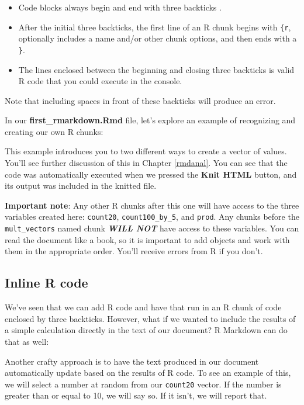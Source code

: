 \documentclass[]{tufte-book}
\providecommand{\tightlist}{%
  \setlength{\itemsep}{0pt}\setlength{\parskip}{0pt}}
\begin{document}
\begin{itemize}
\tightlist
\item
  Code blocks always begin and end with three backticks \texttt{\textasciigrave{}\textasciigrave{}\textasciigrave{}}.
\item
  After the initial three backticks, the first line of an R chunk begins with \texttt{\{r}, optionally includes a name and/or other chunk options, and then ends with a \texttt{\}}.
\item
  The lines enclosed between the beginning and closing three backticks is valid R code that you could execute in the console.
\end{itemize}

Note that including spaces in front of these backticks will produce an error.

In our \textbf{first\_rmarkdown.Rmd} file, let's explore an example of recognizing and creating our own R chunks:

This example introduces you to two different ways to create a vector of values. You'll see further discussion of this in Chapter \ref{rmdanal}. You can see that the code was automatically executed when we pressed the \textbf{Knit HTML} button, and its output was included in the knitted file.

\textbf{Important note}: Any other R chunks after this one will have access to the three variables created here: \texttt{count20}, \texttt{count100\_by\_5}, and \texttt{prod}. Any chunks before the \texttt{mult\_vectors} named chunk \textbf{\emph{WILL NOT}} have access to these variables. You can read the document like a book, so it is important to add objects and work with them in the appropriate order. You'll receive errors from R if you don't.

\hypertarget{inline-r-code}{%
\subsection{Inline R code}\label{inline-r-code}}

We've seen that we can add R code and have that run in an R chunk of code enclosed by three backticks. However, what if we wanted to include the results of a simple calculation directly in the text of our document? R Markdown can do that as well:

Another crafty approach is to have the text produced in our document automatically update based on the results of R code. To see an example of this, we will select a number at random from our \texttt{count20} vector. If the number is greater than or equal to 10, we will say so. If it isn't, we will report that.
\end{document}
